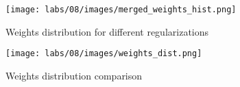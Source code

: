 \begin{figure}
    \centering
    \texttt{[image: labs/08/images/merged\_weights\_hist.png]}
        \caption{Weights distribution for different regularizations }
        \label{fig:Weights distribution for different regularizations}
\end{figure}

\begin{figure}
    \centering
    \texttt{[image: labs/08/images/weights\_dist.png]}
        \caption{Weights distribution comparison}
        \label{fig:Weights distribution comparison}
\end{figure}